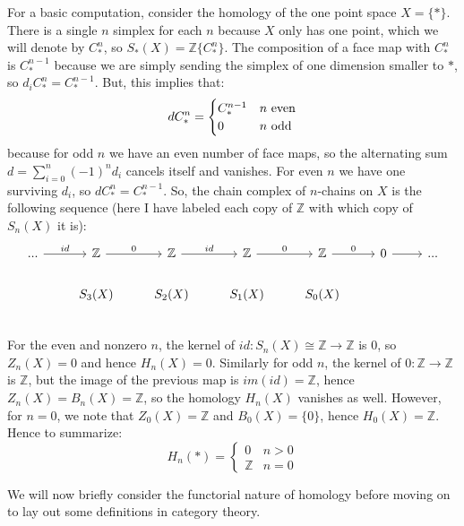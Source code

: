 \documentclass[11pt, oneside]{amsart}   	%
\theoremstyle{definition}
\begin{document}
For a basic computation, consider the homology of the one point space $X = \{*\}$. There is a single $n$ simplex for each 
$n$ because $X$ only has one point, which we will denote by $C_*^n$, so $S_*(X) = \mathbb Z\{C_*^n\}$. The composition 
of a face map with $C_*^n$ is $C_*^{n - 1}$ because we are simply sending the simplex of one dimension smaller to $*$, 
so $d_i C_*^n = C_*^{n - 1}$. But, this implies that:
\begin{equation}
	d C_*^n = \begin{cases}
		C_*^{n - 1} & n\textnormal{ even} \\
		0 & n\textnormal{ odd} \\
	\end{cases}
\end{equation}
because for odd $n$ we have an even number of face maps, so the alternating sum $d = \sum_{i = 0}^n (-1)^n d_i$ cancels 
itself and vanishes. For even $n$ we have one surviving $d_i$, so $d C_*^n = C_*^{n - 1}$. So, the chain complex of 
$n$-chains on $X$ is the following sequence (here I have labeled each copy of $\mathbb Z$ with which copy of $S_n(X)$ 
it is):
\[
	\begin{tikzcd}
		...\arrow[r, "id"] & \mathbb Z\arrow[r, "0"] & \mathbb Z\arrow[r, "id"] & \mathbb Z\arrow[r, "0"]
		& \mathbb Z\arrow[r, "0"] & 0\arrow[r] & ... \\
		 & S_3(X) & S_2(X) & S_1(X) & S_0(X) & \\
	\end{tikzcd}
\]
For the even and nonzero $n$, the kernel of $id : S_n(X)\cong\mathbb Z\rightarrow \mathbb Z$ is 0, so $Z_n(X) = 0$ and 
hence $H_n(X) = 0$. Similarly for odd $n$, the kernel of $0 : \mathbb Z\rightarrow\mathbb Z$ is $\mathbb Z$, but the image 
of the previous map is $im(id) = \mathbb Z$, hence $Z_n(X) = B_n(X) = \mathbb Z$, so the homology $H_n(X)$ vanishes as 
well. However, for $n = 0$, we note that $Z_0(X) = \mathbb Z$ and $B_0(X) = \{0\}$, hence $H_0(X) = \mathbb Z$. 
Hence to summarize:
\begin{equation}
	H_n(*) = \begin{cases}
	0 & n > 0 \\
	\mathbb Z & n = 0
	\end{cases}
\end{equation}

We will now briefly consider the functorial nature of homology before 
moving on to lay out some definitions in category theory. 
\end{document}
